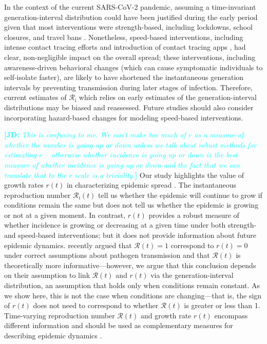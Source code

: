 \documentclass[12pt]{article}
\newcommand{\comment}{\showcomment}
\newcommand{\showcomment}[3]{\textcolor{#1}{\textbf{[#2: }\textsl{#3}\textbf{]}}}
\newcommand{\jd}[1]{\comment{cyan}{JD}{#1}}
\newcommand{\Rx}[1]{\ensuremath{{\mathcal R}_{#1}}\xspace}
\newcommand{\Ri}{\Rx{\mathrm{i}}}
\newcommand{\RR}{\ensuremath{{\mathcal R}}\xspace}
\begin{document}
In the context of the current SARS-CoV-2 pandemic, assuming a time-invariant generation-interval distribution could have been justified during the early period given that most interventions were strength-based, including lockdowns, school closures, and travel bans \citep{flaxman2020estimating,li2021temporal,brauner2021inferring}.
Nonetheless, speed-based interventions, including intense contact tracing efforts \citep{park2020contact} and introduction of contact tracing apps \citep{wymant2021introduction}, had clear, non-negligible impact on the overall spread;
these interventions, including awareness-driven behavioral changes (which can cause symptomatic individuals to self-isolate faster), are likely to have shortened the instantaneous generation intervals by preventing transmission during later stages of infection.
Therefore, current estimates of $\Ri$ which relies on early estimates of the generation-interval distributions may be biased and reassessed.
Future studies should also consider incorporating hazard-based changes for modeling speed-based interventions.

\jd{This is confusing to me. We can't make too much of $r$ as a measure of whether the number is going up or down unless we talk about robust methods for estimating $r$ -- otherwise whether incidence is going up or down is the best measure of whether incidence is going up or down and the fact that we can translate that to the $r$ scale is a triviality.}
Our study highlights the value of growth rates $r(t)$ in characterizing epidemic spread \citep{abbott2020temporal,anderson2020reproduction}.
The instantaneous reproduction number $\Ri(t)$ tell us whether the epidemic will continue to grow if conditions remain the same but does not tell us whether the epidemic is growing or not at a given moment.
In contrast, $r(t)$ provides a robust measure of whether incidence is growing or decreasing at a given time under both strength- and speed-based interventions;
but it does not provide information about future epidemic dynamics.
\cite{parag2021epidemic} recently argued that $\RR(t)=1$ correspond to $r(t) = 0$ under correct assumptions about pathogen transmission and that $\RR(t)$ is theoretically more informative---however, we argue that this conclusion depends on their assumption to link $\RR(t)$ and $r(t)$ via the generation-interval distribution, an assumption that holds only when conditions remain constant.
As we show here, this is not the case when conditions are changing---that is, the sign of $r(t)$ does not need to correspond to whether $\RR(t)$ is greater or less than 1.
Time-varying reproduction number $\RR(t)$ and growth rate $r(t)$ encompass different information and should be used as complementary measures for describing epidemic dynamics \citep{dushoff2021speed}.
\end{document}
